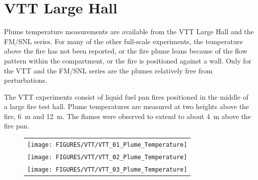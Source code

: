 \clearpage

\section{VTT Large Hall}

\label{VTT_plume}

Plume temperature measurements are available from the VTT Large Hall and the FM/SNL series.
For many of the other full-scale experiments, the temperature above the fire has not been reported, or the fire plume
leans because of the flow pattern within the compartment, or the fire is positioned against a wall.
Only for the VTT and the FM/SNL series are the plumes relatively free from perturbations.

The VTT experiments consist of liquid fuel pan fires positioned in the middle of a large fire test hall.
Plume temperatures are measured at two heights above the fire, 6~m and 12~m.
The flames were observed to extend to about 4~m above the fire pan.



\begin{figure}[h]
\begin{center}
\begin{tabular}{c}
\texttt{[image: FIGURES/VTT/VTT\_01\_Plume\_Temperature]} \\
\texttt{[image: FIGURES/VTT/VTT\_02\_Plume\_Temperature]} \\
\texttt{[image: FIGURES/VTT/VTT\_03\_Plume\_Temperature]} \\
\end{tabular}
\end{center}
\label{VTT_Plume}
\end{figure}

